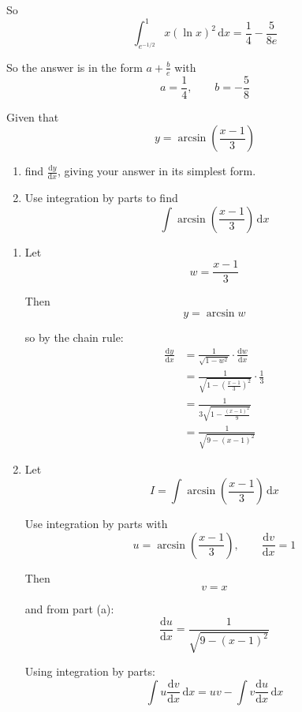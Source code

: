 \documentclass[leqno]{article}
\begin{document}
\begin{enumerate}[
  label=\textbf{\arabic*.},
  leftmargin=*,
  topsep=0pt,
  partopsep=0pt,
  parsep=0pt
]
\begin{djsSolution}
So
\[
\int_{e^{-1/2}}^{1} x(\ln x)^2\,\mathrm{d}x=\frac14-\frac{5}{8e}
\]

So the answer is in the form $a+\frac{b}{e}$ with
\[
a=\frac14,
\qquad
b=-\frac58
\]
\end{djsSolution}


\newpage

\questionitem

Given that
\[
y = \arcsin\left(\frac{x-1}{3}\right)
\]
\begin{enumerate}[label=\textbf{(\alph*)}]
  \item find $\frac{\mathrm{d}y}{\mathrm{d}x}$, giving your answer in its simplest form.  \\
  \item Use integration by parts to find
  \[
  \int \arcsin\left(\frac{x-1}{3}\right)\,\mathrm{d}x
  \]
\end{enumerate}

\vspace*{10pt}

\begin{djsSolution}
\begin{enumerate}[label=\textbf{(\alph*)}]
  \item Let
\[
w=\frac{x-1}{3}
\]

Then
\[
y=\arcsin w
\]

so by the chain rule:
\begin{align*}
\frac{\mathrm{d}y}{\mathrm{d}x}
&=\frac{1}{\sqrt{1-w^2}}\cdot \frac{\mathrm{d}w}{\mathrm{d}x} \\
&=\frac{1}{\sqrt{1-\left(\frac{x-1}{3}\right)^2}}\cdot \frac13 \\
&=\frac{1}{3\sqrt{1-\frac{(x-1)^2}{9}}} \\
&=\frac{1}{\sqrt{9-(x-1)^2}}
\end{align*}

  \item Let
\[
I=\int \arcsin\left(\frac{x-1}{3}\right)\,\mathrm{d}x
\]

Use integration by parts with
\[
u=\arcsin\left(\frac{x-1}{3}\right), \qquad \frac{\mathrm{d}v}{\mathrm{d}x}=1
\]

Then
\[
v=x
\]

and from part (a):
\[
\frac{\mathrm{d}u}{\mathrm{d}x}=\frac{1}{\sqrt{9-(x-1)^2}}
\]

Using integration by parts:
\[
\int u\frac{\mathrm{d}v}{\mathrm{d}x}\,\mathrm{d}x = uv - \int v\frac{\mathrm{d}u}{\mathrm{d}x}\,\mathrm{d}x
\]


\end{enumerate}
\end{djsSolution}
\end{enumerate}
\end{document}
